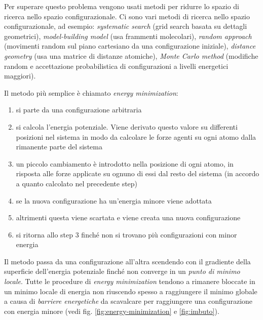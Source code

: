 \par Per superare questo problema vengono usati metodi per ridurre lo spazio di ricerca nello spazio configurazionale. Ci sono vari metodi di ricerca nello spazio configurazionale, ad esempio: \textit{systematic search }(grid search basata su dettagli geometrici), \textit{model-building model }(usa frammenti molecolari), \textit{random approach }(movimenti random sul piano cartesiano da una configurazione iniziale), \textit{distance geometry} (usa una matrice di distanze atomiche), \textit{Monte Carlo method} (modifiche random e accettazione probabilistica di configurazioni a livelli energetici maggiori)\supercite{ROY2015151}.

\par Il metodo più semplice è chiamato \textit{energy minimization}:

\begin{enumerate}
	\item si parte da una configurazione arbitraria
	\item si calcola l'energia potenziale. Viene derivato questo valore su differenti posizioni nel sistema in modo da calcolare le forze agenti su ogni atomo dalla rimanente parte del sistema
	\item un piccolo cambiamento è introdotto nella posizione di ogni atomo, in risposta alle forze applicate su ognuno di essi dal resto del sistema (in accordo a quanto calcolato nel precedente step)
	\item se la nuova configurazione ha un'energia minore viene adottata
	\item altrimenti questa viene scartata e viene creata una nuova configurazione
	\item si ritorna allo step 3 finché non si trovano più configurazioni con minor energia
\end{enumerate}

Il metodo passa da una configurazione all'altra scendendo con il gradiente della superficie dell'energia potenziale finché non converge in un \textit{punto di minimo locale}. Tutte le procedure di \textit{energy minimization }tendono a rimanere bloccate in un minimo locale di energia non riuscendo spesso a raggiungere il minimo globale a causa di \textit{barriere energetiche} da scavalcare per raggiungere una configurazione con energia minore (vedi fig. \ref{fig:energy-minimization} e \ref{fig:imbuto}).

